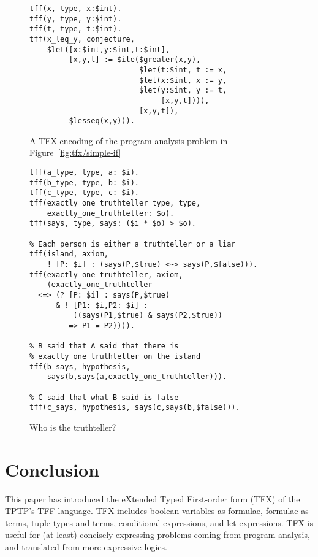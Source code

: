 \begin{figure}[htbp]\centering
\begin{BVerbatim}
tff(x, type, x:$int).
tff(y, type, y:$int).
tff(t, type, t:$int).
tff(x_leq_y, conjecture,
    $let([x:$int,y:$int,t:$int],
         [x,y,t] := $ite($greater(x,y),
                         $let(t:$int, t := x,
                         $let(x:$int, x := y,
                         $let(y:$int, y := t,
                              [x,y,t]))),
                         [x,y,t]),
         $lesseq(x,y))).
\end{BVerbatim}
\caption{A TFX encoding of the program analysis problem in
Figure~\ref{fig:tfx/simple-if}}
\label{fig:tfx/LetITE}
\end{figure}

\begin{figure}[htbp]\centering
\begin{BVerbatim}
tff(a_type, type, a: $i).
tff(b_type, type, b: $i).
tff(c_type, type, c: $i).
tff(exactly_one_truthteller_type, type,
    exactly_one_truthteller: $o).
tff(says, type, says: ($i * $o) > $o).

tff(island, axiom,
    ! [P: $i] : (says(P,$true) <~> says(P,$false))).
tff(exactly_one_truthteller, axiom,
    (exactly_one_truthteller
  <=> (? [P: $i] : says(P,$true)
      & ! [P1: $i,P2: $i] :
          ((says(P1,$true) & says(P2,$true))
         => P1 = P2)))).

tff(b_says, hypothesis,
    says(b,says(a,exactly_one_truthteller))).

tff(c_says, hypothesis, says(c,says(b,$false))).
\end{BVerbatim}
\caption{Who is the truthteller?}
\label{fig:tfx/Truthteller}
\end{figure}

\section{Conclusion}
\label{sec:tfx/Conclusion}

This paper has introduced the eXtended Typed First-order form (TFX) of the
TPTP's TFF language.
TFX includes boolean variables as formulae, formulae as terms, tuple types and
terms, conditional expressions, and let expressions.
TFX is useful for (at least) concisely expressing problems coming from 
program analysis, and translated from more expressive logics.

